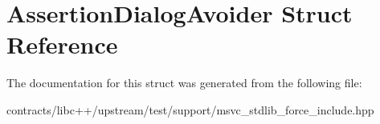 \hypertarget{struct_assertion_dialog_avoider}{}\section{Assertion\+Dialog\+Avoider Struct Reference}
\label{struct_assertion_dialog_avoider}


The documentation for this struct was generated from the following file\+:\begin{DoxyCompactItemize}
\item 
contracts/libc++/upstream/test/support/msvc\+\_\+stdlib\+\_\+force\+\_\+include.\+hpp\end{DoxyCompactItemize}
